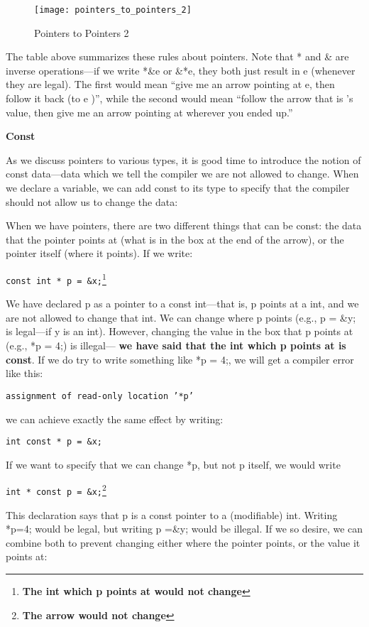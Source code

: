 \documentclass[11pt, a4paper]{article}
\begin{document}
\begin{figure}[htpb]
  \centering
  \texttt{[image: pointers\_to\_pointers\_2]}
  \caption{Pointers to Pointers 2}
  \label{fig:pointers_to_pointers_2}
\end{figure}


The table above summarizes these rules about pointers. Note that * and \& are inverse operations—if we write *\&e or \&*e, they both just result in e (whenever they are legal). The first would mean “give me an arrow pointing at e, then follow it back (to e )”, while the second would mean “follow the arrow that is ’s value, then give me an arrow pointing at wherever you ended up.”

\textbf{Const}


As we discuss pointers to various types, it is good time to introduce the notion of const data—data which we tell the compiler we are not allowed to change. When we declare a variable, we can add const to its type to specify that the compiler should not allow us to change the data:

When we have pointers, there are two different things that can be const: the data that the pointer points at (what is in the box at the end of the arrow), or the pointer itself (where it points). If we write:

\texttt{const int * p = \&x;}\footnote{ \textbf{The int which p points at would not change}} 

We have declared p as a pointer to a const int—that is, p points at a int, and we are not allowed to change that int. We can change where p points (e.g., p = \&y; is legal—if y is an int). However, changing the value in the box that p points at (e.g., *p = 4;) is illegal— \textbf{we have said that the int which p points at is const}. If we do try to write something like *p = 4;, we will get a compiler error like this:


\texttt{assignment of read-only location '*p'} 

we can achieve exactly the same effect by writing:

\texttt{int const * p = \&x;} 

If we want to specify that we can change *p, but not p itself, we would write

\texttt{int * const p = \&x;}\footnote{ \textbf{The arrow would not change}}


This declaration says that p is a const pointer to a (modifiable) int. Writing *p=4; would be legal, but writing p =\&y; would be illegal. If we so desire, we can combine both to prevent changing either where the pointer points, or the value it points at:
\end{document}
